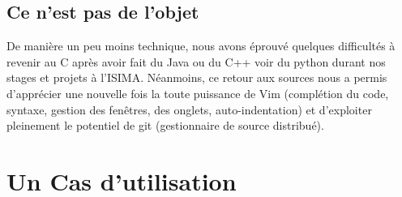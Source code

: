 \subsection{Ce n'est pas de l'objet}

De manière un peu moins technique, nous avons éprouvé quelques difficultés à revenir au C après avoir fait du Java ou du C++ voir du python durant nos stages et projets à l'ISIMA. Néanmoins, ce retour aux sources nous a permis d'apprécier une nouvelle fois la toute puissance de Vim (complétion du code, syntaxe, gestion des fenêtres, des onglets, auto-indentation) et d'exploiter pleinement le potentiel de git (gestionnaire de source distribué).

\section{Un Cas d'utilisation}

